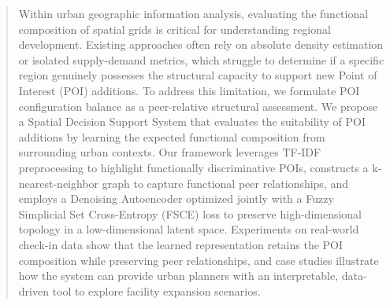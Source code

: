 \documentclass[sigconf]{acmart}
\begin{document}
\renewcommand{\shortauthors}{Chen et al.}

\begin{abstract}
Within urban geographic information analysis, evaluating the functional composition of spatial grids is critical for understanding regional development. Existing approaches often rely on absolute density estimation or isolated supply-demand metrics, which struggle to determine if a specific region genuinely possesses the structural capacity to support new Point of Interest (POI) additions. To address this limitation, we formulate POI configuration balance as a peer-relative structural assessment. We propose a Spatial Decision Support System that evaluates the suitability of POI additions by learning the expected functional composition from surrounding urban contexts. Our framework leverages TF-IDF preprocessing to highlight functionally discriminative POIs, constructs a k-nearest-neighbor graph to capture functional peer relationships, and employs a Denoising Autoencoder optimized jointly with a Fuzzy Simplicial Set Cross-Entropy (FSCE) loss to preserve high-dimensional topology in a low-dimensional latent space. Experiments on real-world check-in data show that the learned representation retains the POI composition while preserving peer relationships, and case studies illustrate how the system can provide urban planners with an interpretable, data-driven tool to explore facility expansion scenarios.
\end{abstract}
\end{document}
